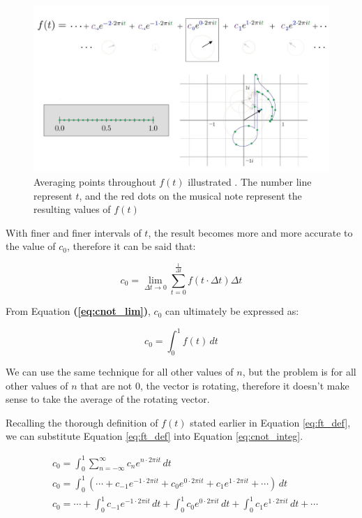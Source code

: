 \documentclass[letterpaper, 12pt]{article}
\begin{document}
\begin{figure}[H]
    \centering
    \includegraphics[width=\textwidth]{cnot_integ.jpeg}
    \caption{Averaging points throughout \protect\(f(t)\) illustrated \protect\cite{sandersonWhatFourierSeries2019}. The number line represent \protect\(t\), and the red dots on the musical note represent the resulting values of \protect\(f(t)\)}
    \label{fig:cnot_integ}
\end{figure}

With finer and finer intervals of \(t\), the result
becomes more and more accurate to the value of \(c_0\), therefore it can be
said that:

\begin{equation}
    c_0 = \lim_{\Delta t \to 0} \sum_{t = 0}^{\frac{1}{\Delta t}} f(t \cdot \Delta t) \Delta t
    \label{eq:cnot_lim}
\end{equation}

From Equation \textbf{(\ref*{eq:cnot_lim})}, \(c_0\) can ultimately be expressed as:

\begin{equation}
    c_0 = \int_{0}^{1} f(t) \,dt
    \label{eq:cnot_integ}
\end{equation}


We can use the same technique for all other values of \(n\), but the problem is
for all other values of \(n\) that are not 0, the vector is rotating, therefore
it doesn't make sense to take the average of the rotating vector.

Recalling the thorough definition of \(f(t)\) stated earlier in Equation \ref*{eq:ft_def},
we can substitute Equation \ref*{eq:ft_def} into Equation \ref*{eq:cnot_integ}.

\begin{align*}
     & c_0 = \int_{0}^{1} \sum_{n=-\infty}^{\infty} c_n e^{n \cdot 2\pi it} \,dt
    \\
     & c_0 = \int_{0}^{1} \left( \cdots + c_{-1} e^{-1 \cdot 2\pi it} + c_{0} e^{0 \cdot 2\pi it} + c_{1} e^{1 \cdot 2\pi it} + \cdots \right) \,dt
    \\
     & c_0 = \cdots + \int_{0}^{1} c_{-1} e^{-1 \cdot 2\pi it} \,dt + \int_{0}^{1} c_{0} e^{0 \cdot 2\pi it} \,dt + \int_{0}^{1} c_{1} e^{1 \cdot 2\pi it} \,dt + \cdots
\end{align*}
\end{document}

